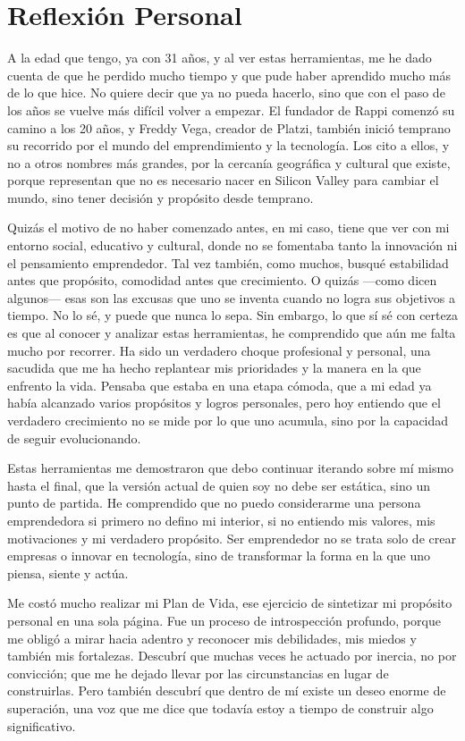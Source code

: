 \chapter{Reflexión Personal}

A la edad que tengo, ya con 31 años, y al ver estas herramientas, me he dado cuenta de que he perdido mucho tiempo y que pude haber aprendido mucho más de lo que hice. No quiere decir que ya no pueda hacerlo, sino que con el paso de los años se vuelve más difícil volver a empezar. El fundador de Rappi comenzó su camino a los 20 años, y Freddy Vega, creador de Platzi, también inició temprano su recorrido por el mundo del emprendimiento y la tecnología. Los cito a ellos, y no a otros nombres más grandes, por la cercanía geográfica y cultural que existe, porque representan que no es necesario nacer en Silicon Valley para cambiar el mundo, sino tener decisión y propósito desde temprano.

Quizás el motivo de no haber comenzado antes, en mi caso, tiene que ver con mi entorno social, educativo y cultural, donde no se fomentaba tanto la innovación ni el pensamiento emprendedor. Tal vez también, como muchos, busqué estabilidad antes que propósito, comodidad antes que crecimiento. O quizás —como dicen algunos— esas son las excusas que uno se inventa cuando no logra sus objetivos a tiempo. No lo sé, y puede que nunca lo sepa. Sin embargo, lo que sí sé con certeza es que al conocer y analizar estas herramientas, he comprendido que aún me falta mucho por recorrer. Ha sido un verdadero choque profesional y personal, una sacudida que me ha hecho replantear mis prioridades y la manera en la que enfrento la vida. Pensaba que estaba en una etapa cómoda, que a mi edad ya había alcanzado varios propósitos y logros personales, pero hoy entiendo que el verdadero crecimiento no se mide por lo que uno acumula, sino por la capacidad de seguir evolucionando.

Estas herramientas me demostraron que debo continuar iterando sobre mí mismo hasta el final, que la versión actual de quien soy no debe ser estática, sino un punto de partida. He comprendido que no puedo considerarme una persona emprendedora si primero no defino mi interior, si no entiendo mis valores, mis motivaciones y mi verdadero propósito. Ser emprendedor no se trata solo de crear empresas o innovar en tecnología, sino de transformar la forma en la que uno piensa, siente y actúa.

Me costó mucho realizar mi Plan de Vida, ese ejercicio de sintetizar mi propósito personal en una sola página. Fue un proceso de introspección profundo, porque me obligó a mirar hacia adentro y reconocer mis debilidades, mis miedos y también mis fortalezas. Descubrí que muchas veces he actuado por inercia, no por convicción; que me he dejado llevar por las circunstancias en lugar de construirlas. Pero también descubrí que dentro de mí existe un deseo enorme de superación, una voz que me dice que todavía estoy a tiempo de construir algo significativo.

